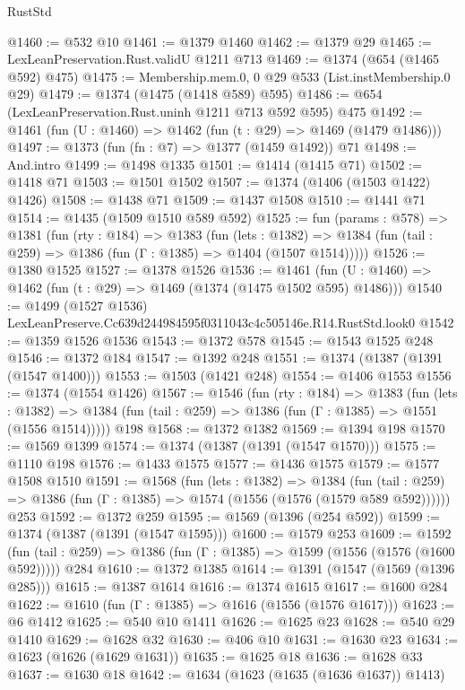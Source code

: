 \begin{lexlean}{RustStd}
\begin{coremodule}
@1460 := @532 @10
@1461 := @1379 @1460
@1462 := @1379 @29
@1465 := LexLeanPreservation.Rust.validU @1211 @713
@1469 := @1374 (@654 (@1465 @592) @475)
@1475 := Membership.mem.{0, 0} @29 @533 (List.instMembership.{0} @29)
@1479 := @1374 (@1475 (@1418 @589) @595)
@1486 := @654 (LexLeanPreservation.Rust.uninh @1211 @713 @592 @595) @475
@1492 := @1461 (fun (U : @1460) => @1462 (fun (t : @29) => @1469 (@1479 @1486)))
@1497 := @1373 (fun (fn : @7) => @1377 (@1459 @1492)) @71
@1498 := And.intro
@1499 := @1498 @1335
@1501 := @1414 (@1415 @71)
@1502 := @1418 @71
@1503 := @1501 @1502
@1507 := @1374 (@1406 (@1503 @1422) @1426)
@1508 := @1438 @71
@1509 := @1437 @1508
@1510 := @1441 @71
@1514 := @1435 (@1509 @1510 @589 @592)
@1525 := fun (params : @578) =>
  @1381
    (fun (rty : @184) =>
    @1383
      (fun (lets : @1382) =>
      @1384 (fun (tail : @259) => @1386 (fun (Γ : @1385) => @1404 (@1507 @1514)))))
@1526 := @1380 @1525
@1527 := @1378 @1526
@1536 := @1461 (fun (U : @1460) => @1462 (fun (t : @29) => @1469 (@1374 (@1475 @1502 @595) @1486)))
@1540 := @1499 (@1527 @1536) LexLeanPreserve.Cc639d244984595f0311043c4c505146e.R14.RustStd.look0
@1542 := @1359 @1526 @1536
@1543 := @1372 @578
@1545 := @1543 @1525 @248
@1546 := @1372 @184
@1547 := @1392 @248
@1551 := @1374 (@1387 (@1391 (@1547 @1400)))
@1553 := @1503 (@1421 @248)
@1554 := @1406 @1553
@1556 := @1374 (@1554 @1426)
@1567 := @1546
    (fun (rty : @184) =>
    @1383
      (fun (lets : @1382) =>
      @1384 (fun (tail : @259) => @1386 (fun (Γ : @1385) => @1551 (@1556 @1514)))))
    @198
@1568 := @1372 @1382
@1569 := @1394 @198
@1570 := @1569 @1399
@1574 := @1374 (@1387 (@1391 (@1547 @1570)))
@1575 := @1110 @198
@1576 := @1433 @1575
@1577 := @1436 @1575
@1579 := @1577 @1508 @1510
@1591 := @1568
    (fun (lets : @1382) =>
    @1384 (fun (tail : @259) => @1386 (fun (Γ : @1385) => @1574 (@1556 (@1576 (@1579 @589 @592))))))
    @253
@1592 := @1372 @259
@1595 := @1569 (@1396 (@254 @592))
@1599 := @1374 (@1387 (@1391 (@1547 @1595)))
@1600 := @1579 @253
@1609 := @1592
    (fun (tail : @259) => @1386 (fun (Γ : @1385) => @1599 (@1556 (@1576 (@1600 @592)))))
    @284
@1610 := @1372 @1385
@1614 := @1391 (@1547 (@1569 (@1396 @285)))
@1615 := @1387 @1614
@1616 := @1374 @1615
@1617 := @1600 @284
@1622 := @1610 (fun (Γ : @1385) => @1616 (@1556 (@1576 @1617)))
@1623 := @6 @1412
@1625 := @540 @10 @1411
@1626 := @1625 @23
@1628 := @540 @29 @1410
@1629 := @1628 @32
@1630 := @406 @10
@1631 := @1630 @23
@1634 := @1623 (@1626 (@1629 @1631))
@1635 := @1625 @18
@1636 := @1628 @33
@1637 := @1630 @18
@1642 := @1634 (@1623 (@1635 (@1636 @1637)) @1413)

\end{coremodule}
\end{lexlean}
